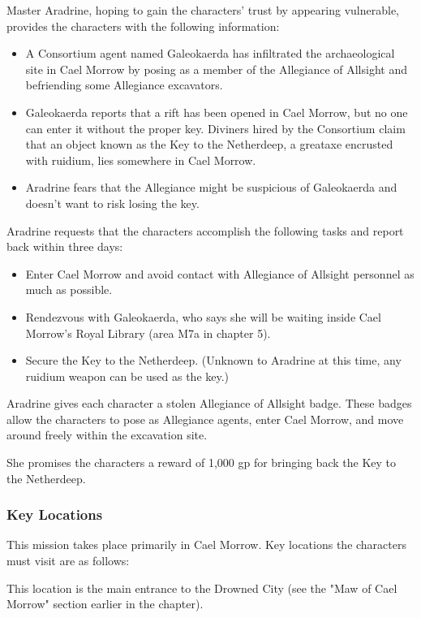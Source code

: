\documentclass[10pt,a4paper,twoside,twocolumn,openany,nodeprecatedcode]{dndbook}
\begin{document}
Master Aradrine, hoping to gain the characters' trust by appearing vulnerable, provides the characters with the following information:


\begin{itemize}
\item A Consortium agent named Galeokaerda has infiltrated the archaeological site in Cael Morrow by posing as a member of the Allegiance of Allsight and befriending some Allegiance excavators.
\item Galeokaerda reports that a rift has been opened in Cael Morrow, but no one can enter it without the proper key. Diviners hired by the Consortium claim that an object known as the Key to the Netherdeep, a greataxe encrusted with ruidium, lies somewhere in Cael Morrow.
\item Aradrine fears that the Allegiance might be suspicious of Galeokaerda and doesn't want to risk losing the key.
\end{itemize}

Aradrine requests that the characters accomplish the following tasks and report back within three days:


\begin{itemize}
\item Enter Cael Morrow and avoid contact with Allegiance of Allsight personnel as much as possible.
\item Rendezvous with Galeokaerda, who says she will be waiting inside Cael Morrow's Royal Library (area M7a in chapter 5).
\item Secure the Key to the Netherdeep. (Unknown to Aradrine at this time, any ruidium weapon can be used as the key.)
\end{itemize}

Aradrine gives each character a stolen Allegiance of Allsight badge. These badges allow the characters to pose as Allegiance agents, enter Cael Morrow, and move around freely within the excavation site.

She promises the characters a reward of 1,000 gp for bringing back the Key to the Netherdeep.

\subsubsection{Key Locations}
This mission takes place primarily in Cael Morrow. Key locations the characters must visit are as follows:


\begin{description}[nolistsep]
\item[Maw of Cael Morrow.]
This location is the main entrance to the Drowned City (see the "Maw of Cael Morrow" section earlier in the chapter).
\end{description}
\end{document}

